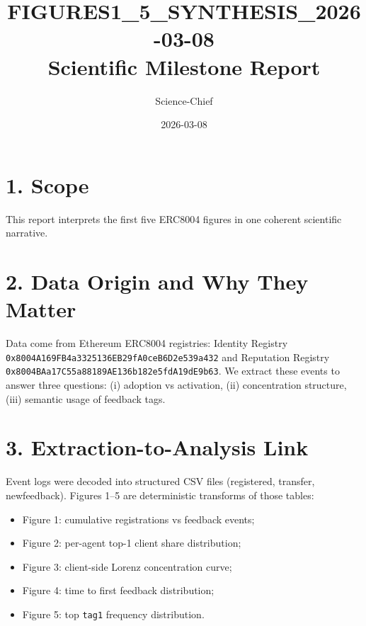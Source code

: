 \documentclass[11pt,a4paper]{article}
\title{FIGURES1\_5\_SYNTHESIS\_2026-03-08\\Scientific Milestone Report}
\author{Science-Chief}
\date{2026-03-08}
\begin{document}
\maketitle

\section*{1. Scope}
This report interprets the first five ERC8004 figures in one coherent scientific narrative.

\section*{2. Data Origin and Why They Matter}
Data come from Ethereum ERC8004 registries:
Identity Registry \texttt{0x8004A169FB4a3325136EB29fA0ceB6D2e539a432} and Reputation Registry \texttt{0x8004BAa17C55a88189AE136b182e5fdA19dE9b63}.
We extract these events to answer three questions: (i) adoption vs activation, (ii) concentration structure, (iii) semantic usage of feedback tags.

\section*{3. Extraction-to-Analysis Link}
Event logs were decoded into structured CSV files (registered, transfer, newfeedback). Figures 1--5 are deterministic transforms of those tables:
\begin{itemize}
\item Figure 1: cumulative registrations vs feedback events;
\item Figure 2: per-agent top-1 client share distribution;
\item Figure 3: client-side Lorenz concentration curve;
\item Figure 4: time to first feedback distribution;
\item Figure 5: top \texttt{tag1} frequency distribution.
\end{itemize}
\end{document}
